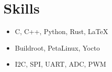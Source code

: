 \section*{Skills}
\begin{itemize}[itemsep=-0.5em]
    \item C, C++, Python, Rust, \LaTeX
    \item Buildroot, PetaLinux, Yocto
    \item I2C, SPI, UART, ADC, PWM
\end{itemize}

